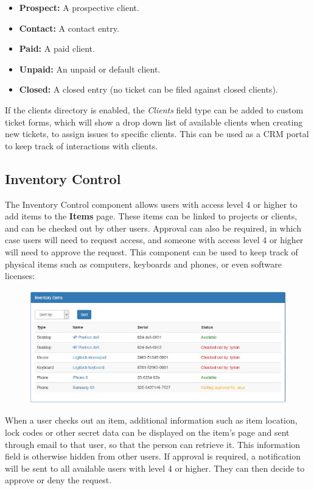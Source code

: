 \documentclass[11pt]{article}
\begin{document}
\begin{itemize}
\item \textbf{Prospect:} A prospective client.
\item \textbf{Contact:} A contact entry.
\item \textbf{Paid:} A paid client.
\item \textbf{Unpaid:} An unpaid or default client.
\item \textbf{Closed:} A closed entry (no ticket can be filed against closed clients).
\end{itemize}

If the clients directory is enabled, the \textit{Clients} field type can be added to custom ticket forms, which will show a drop down list of available clients when creating new tickets, to assign issues to specific clients. This can be used as a CRM portal to keep track of interactions with clients. 

\subsection{Inventory Control}
The Inventory Control component allows users with access level 4 or higher to add items to the \textbf{Items} page. These items can be linked to projects or clients, and can be checked out by other users. Approval can also be required, in which case users will need to request access, and someone with access level 4 or higher will need to approve the request. This component can be used to keep track of physical items such as computers, keyboards and phones, or even software licenses:

\begin{figure}[h]
\includegraphics{items.jpg}
\end{figure}

When a user checks out an item, additional information such as item location, lock codes or other secret data can be displayed on the item's page and sent through email to that user, so that the person can retrieve it. This information field is otherwise hidden from other users. If approval is required, a notification will be sent to all available users with level 4 or higher. They can then decide to approve or deny the request.
\end{document}
